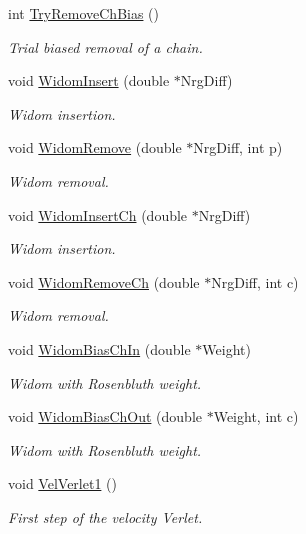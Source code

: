 \begin{DoxyCompactItemize}
int \hyperlink{classForces_a32c3f4b656bce2cf73370ce605f53113}{Try\+Remove\+Ch\+Bias} ()
\begin{DoxyCompactList}\small\item\em Trial biased removal of a chain. \end{DoxyCompactList}\item 
void \hyperlink{classForces_af9eda9a781eabd31a8813c9a64f2d5ec}{Widom\+Insert} (double $\ast$Nrg\+Diff)
\begin{DoxyCompactList}\small\item\em Widom insertion. \end{DoxyCompactList}\item 
void \hyperlink{classForces_a85d825b7b4af29d476abbf098ce630e3}{Widom\+Remove} (double $\ast$Nrg\+Diff, int p)
\begin{DoxyCompactList}\small\item\em Widom removal. \end{DoxyCompactList}\item 
void \hyperlink{classForces_acffb530559d4e3ebfac6481a46468f52}{Widom\+Insert\+Ch} (double $\ast$Nrg\+Diff)
\begin{DoxyCompactList}\small\item\em Widom insertion. \end{DoxyCompactList}\item 
void \hyperlink{classForces_a0ab84cf7b372ab5ae21966ed671ee4c3}{Widom\+Remove\+Ch} (double $\ast$Nrg\+Diff, int c)
\begin{DoxyCompactList}\small\item\em Widom removal. \end{DoxyCompactList}\item 
void \hyperlink{classForces_af07ae7761f13798c6de1391b10c5856d}{Widom\+Bias\+Ch\+In} (double $\ast$Weight)
\begin{DoxyCompactList}\small\item\em Widom with Rosenbluth weight. \end{DoxyCompactList}\item 
void \hyperlink{classForces_ab249c91e15e3611167002159ef6d5b60}{Widom\+Bias\+Ch\+Out} (double $\ast$Weight, int c)
\begin{DoxyCompactList}\small\item\em Widom with Rosenbluth weight. \end{DoxyCompactList}\item 
void \hyperlink{classForces_a7a55d93047438c9c5f5f9145a995e8d0}{Vel\+Verlet1} ()
\begin{DoxyCompactList}\small\item\em First step of the velocity Verlet. \end{DoxyCompactList}\item 

\end{DoxyCompactItemize}
